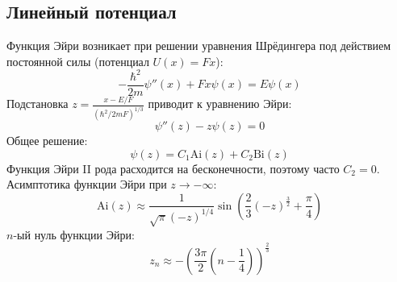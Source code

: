\documentclass[12pt]{article}
\theoremstyle{definition}
\begin{document}
\subsection{Линейный потенциал}
Функция Эйри возникает при решении уравнения Шрёдингера под действием постоянной силы (потенциал $U(x)=Fx$):
\begin{equation}
    -\frac{\hbar^2}{2m}\psi''(x)+Fx\psi(x)=E\psi(x)
\end{equation}
Подстановка $z=\frac{x-E/F}{(\hbar^2/2mF)^{1/3}}$ приводит к уравнению Эйри:
\begin{equation}
    \psi''(z)-z\psi(z)=0
\end{equation}
Общее решение:
\begin{equation}
    \psi(z)=C_1\text{Ai}(z)+C_2\text{Bi}(z)
\end{equation}
Функция Эйри II рода расходится на бесконечности, поэтому часто $C_2=0$. Асимптотика функции Эйри при $z\rightarrow-\infty$:
\begin{equation}
    \text{Ai}(z)\approx\frac{1}{\sqrt{\pi}(-z)^{1/4}}\sin\left(\frac{2}{3}(-z)^\frac{3}{2}+\frac{\pi}{4}\right)
\end{equation}
$n$-ый нуль функции Эйри:
\begin{equation}
    z_n\approx-\left(\frac{3\pi}{2}\left(n-\frac{1}{4}\right)\right)^\frac{2}{3}
\end{equation}
\end{document}
